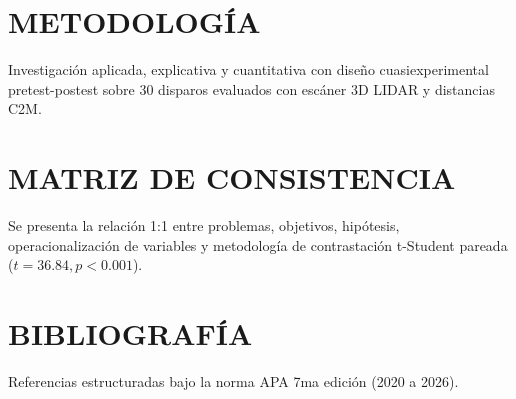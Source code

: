 \documentclass[12pt,a4paper]{article}
\begin{document}
\section{METODOLOGÍA}
Investigación aplicada, explicativa y cuantitativa con diseño cuasiexperimental pretest-postest sobre 30 disparos evaluados con escáner 3D LIDAR y distancias C2M.

\section{MATRIZ DE CONSISTENCIA}
Se presenta la relación 1:1 entre problemas, objetivos, hipótesis, operacionalización de variables y metodología de contrastación t-Student pareada ($t = 36.84, p < 0.001$).

\section{BIBLIOGRAFÍA}
Referencias estructuradas bajo la norma APA 7ma edición (2020 a 2026).
\end{document}
